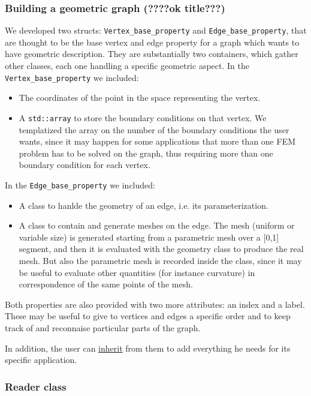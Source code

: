\documentclass[11pt]{article} %
\newcommand{\classname}[1]{\texttt{#1}}
\begin{document}
		\subsubsection{Building a geometric graph (????ok title???)}
		We developed two structs: \classname{Vertex\_base\_property} and \classname{Edge\_base\_property}, that are thought to be the base vertex and edge property for a graph which wants to have geometric description. They are substantially two containers, which gather other classes, each one handling a specific geometric aspect. \newline
		In the \classname{Vertex\_base\_property} we included:
		\begin{itemize}
			\item The coordinates of the point in the space representing the vertex.
			\item A \texttt{std::array} to store the boundary conditions on that vertex. We templatized the array on the number of the boundary conditions the user wants, since it may happen for some applications that more than one FEM problem has to be solved on the graph, thus requiring more than one boundary condition for each vertex.
		\end{itemize}
		In the \classname{Edge\_base\_property} we included:
		\begin{itemize}
			\item A class to hanlde the geometry of an edge, i.e. its parameterization. 
			\item A class to contain and generate meshes on the edge. The mesh (uniform or variable size) is generated starting from a parametric mesh over a [0,1] segment, and then it is evaluated with the geometry class to produce the real mesh. But also the parametric mesh is recorded inside the class, since it may be useful to evaluate other quantities (for instance curvature) in correspondence of the same points of the mesh.
		\end{itemize}
		Both properties are also provided with two more attributes: an index and a label. These may be useful to give to vertices and edges a specific order and to keep track of and reconnaise particular parts of the graph.
		
		In addition, the user can \underline{inherit} from them to add everything he needs for its specific application.
	
	
		\subsubsection{Reader class}
		
\end{document}
